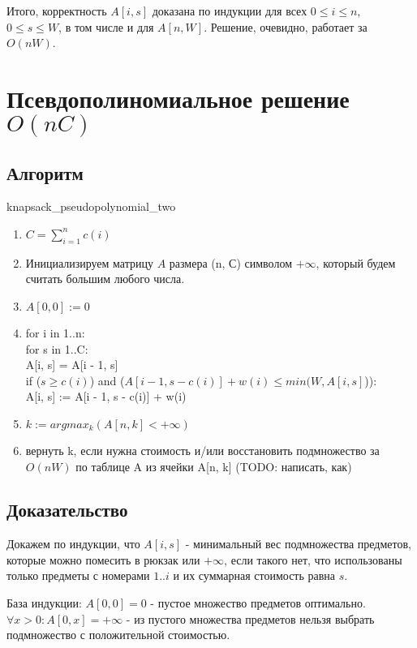 \documentclass{article}
\begin{document}
	Итого, корректность $A[i, s]$ доказана по индукции для всех $ 0 \leq i \leq n$, $0 \leq s \leq W$, в том числе и для $A[n, W]$. Решение, очевидно, работает за $O(nW)$.


\section{Псевдополиномиальное решение $O(nC)$}
	\subsection{Алгоритм}
	
	knapsack\_pseudopolynomial\_two
	\begin{enumerate}
		\item $C = \sum\limits_{i = 1}^{n} {c(i)}$
		\item Инициализируем матрицу $A$ размера (n, С) символом $+\infty$, который будем считать большим любого числа.
		\item $A[0, 0] := 0$
		\item for i in 1..n: \\
			for s in 1..C: \\
			A[i, s] = A[i - 1, s] \\
			if ($s \geq c(i)$) and ($A[i - 1, s - c(i)] + w(i) \leq min(W, A[i, s]$)): \\
				A[i, s] := A[i - 1, s - c(i)] + w(i)
		\item $k := argmax_{k}(A[n, k] < +\infty)$
		\item вернуть k, если нужна стоимость и/или восстановить подмножество за $O(nW)$ по таблице A из ячейки A[n, k] (TODO: написать, как)
			
	\end{enumerate}
	
	\subsection{Доказательство}
	
	Докажем по индукции, что $A[i, s]$ - минимальный вес подмножества предметов, которые можно помесить в рюкзак или $+\infty$, если такого нет, что использованы только предметы с номерами $1..i$ и их суммарная стоимость равна $s$.
	
	База индукции: $A[0, 0] = 0$ - пустое множество предметов оптимально.
	$\forall x > 0: A[0, x] = +\infty$ - из пустого множества предметов нельзя выбрать подмножество с положительной стоимостью.
	
\end{document}
